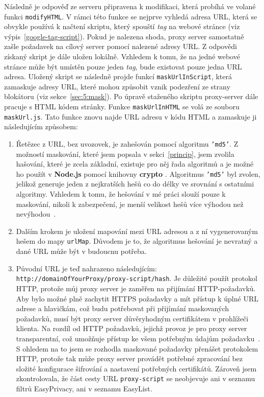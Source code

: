 Následně je odpověď ze serveru připravena k modifikaci, která probíhá ve volané funkci \texttt{modifyHTML}. V rámci této funkce se nejprve vyhledá adresa URL, která se obvykle používá k načtení skriptu, který spouští {\it tag} na webové stránce (viz výpis~\ref{google-tag-script}). Pokud je nalezena shoda, proxy server samostatně zašle požadavek na cílový server pomocí nalezené adresy URL. Z odpovědi získaný skript je dále uložen lokálně. Vzhledem k tomu, že na jedné  webové stránce může být umístěn pouze jeden {\it tag}, bude existovat pouze jedna URL adresa. Uložený skript se následně projde funkcí \texttt{maskUrlInScript}, která zamaskuje adresy URL, které mohou způsobit vznik podezření ze strany blokátoru (viz sekce~\ref{sec:5:mask}). Po úpravě staženého skriptu proxy-server dále pracuje s HTML kódem stránky. Funkce \texttt{maskUrlInHTML} se volá ze souboru \texttt{maskUrl.js}. Tato funkce znovu najde URL adresu v kódu HTML a zamaskuje ji následujícím způsobem:
\begin{enumerate}
    \item Řetězec z URL, bez uvozovek, je zahešován pomocí algoritmu \texttt{'md5'}. Z možností maskování, které jsem popsala v sekci~\ref{princip}, jsem zvolila hašování, které je zcela základní, existuje pro něj řada algoritmů a je možné ho použít v \textbf{Node.js} pomocí knihovny \textbf{crypto} \cite{crypto}. Algoritmus \texttt{'md5'} byl zvolen, jelikož generuje jeden z nejkratších hešů co do délky ve srovnání s ostatními algoritmy. Vzhledem k tomu, že hešování v mé práci slouží pouze k maskování, nikoli k zabezpečení, je menší velikost hešů více výhodou než nevýhodou~\cite{md5}.
    \item Dalším krokem je uložení mapování mezi URL adresou a z ní vygenerovaným hešem do mapy \texttt{urlMap}. Důvodem je to, že algoritmus hešování je nevratný a dané URL může být v budoucnu potřeba.
    \item Původní URL je teď nahrazeno následujícím:\\
    \texttt{http://domainOfYourProxy/proxy-script/hash}. Je důležité použít protokol HTTP, protože můj proxy server je zaměřen na přijímání HTTP-požadavků. Aby bylo možné plně zachytit HTTPS požadavky a mít přístup k úplné URL adrese a hlavičkám, což budu potřebovat při přijímání maskovaných požadavků, musí být proxy server důvěryhodným certifikátem v prohlížeči klienta. Na rozdíl od HTTP požadavků, jejichž provoz je pro proxy server transparentní, což umožňuje přístup ke všem potřebným údajům požadavku~\cite{mitm}. S ohledem na to jsem se rozhodla maskované požadavky přenášet protokolem HTTP, protože tak může proxy server provádět potřebné zpracování bez složité konfigurace šifrování a nastavení potřebných certifikátů. Zároveň jsem zkontrolovala, že část cesty URL \texttt{proxy-script} se neobjevuje ani v seznamu filtrů EasyPrivacy, ani v seznamu EasyList.
\end{enumerate}

